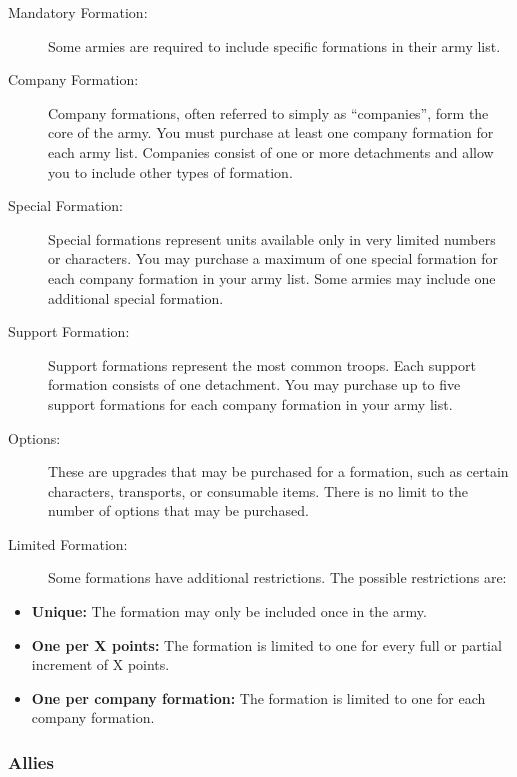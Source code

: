 \begin{description}
    \item[Mandatory Formation:] Some armies are required to include specific formations in their army list.

    \item[Company Formation:] Company formations, often referred to simply as ``companies'', form the core of the army. You must purchase at least one company formation for each army list. Companies consist of one or more detachments and allow you to include other types of formation.

    \item[Special Formation:] Special formations represent units available only in very limited numbers or characters. You may purchase a maximum of one special formation for each company formation in your army list. Some armies may include one additional special formation.

    \item[Support Formation:] Support formations represent the most common troops. Each support formation consists of one detachment. You may purchase up to five support formations for each company formation in your army list.

    \item[Options:] These are upgrades that may be purchased for a formation, such as certain characters, transports, or consumable items. There is no limit to the number of options that may be purchased.

    \item[Limited Formation:] Some formations have additional restrictions. The possible restrictions are:
\end{description}

\begin{itemize}
    \item \textbf{Unique:} The formation may only be included once in the army.
    \item \textbf{One per X points:} The formation is limited to one for every full or partial increment of X points.
    \item \textbf{One per company formation:} The formation is limited to one for each company formation.
\end{itemize}

\subsubsection{Allies}

